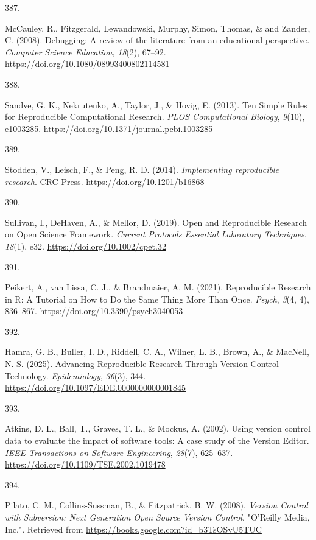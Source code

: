 \documentclass[
  11pt,
  letterpaper,
]{scrreprt}
\newlength{\cslhangindent}
\newlength{\csllabelwidth}
\newenvironment{CSLReferences}[2] %
 {\begin{list}{}{%
  \setlength{\itemindent}{0pt}
  \setlength{\leftmargin}{0pt}
  \setlength{\parsep}{0pt}
  \ifodd #1
   \setlength{\leftmargin}{\cslhangindent}
   \setlength{\itemindent}{-1\cslhangindent}
  \fi
  \setlength{\itemsep}{#2\baselineskip}}}
 {\end{list}}
\newcommand{\CSLLeftMargin}[1]{\parbox[t]{\csllabelwidth}{\strut#1\strut}}
\newcommand{\CSLRightInline}[1]{\parbox[t]{\linewidth - \csllabelwidth}{\strut#1\strut}}
\begin{document}
\begin{CSLReferences}{0}{0}
\CSLLeftMargin{387. }%
\CSLRightInline{McCauley, R., Fitzgerald, Lewandowski, Murphy, Simon,
Thomas, \& and Zander, C. (2008). Debugging: A review of the literature
from an educational perspective. \emph{Computer Science Education},
\emph{18}(2), 67--92. \url{https://doi.org/10.1080/08993400802114581}}

\CSLLeftMargin{388. }%
\CSLRightInline{Sandve, G. K., Nekrutenko, A., Taylor, J., \& Hovig, E.
(2013). Ten {Simple Rules} for {Reproducible Computational Research}.
\emph{PLOS Computational Biology}, \emph{9}(10), e1003285.
\url{https://doi.org/10.1371/journal.pcbi.1003285}}

\CSLLeftMargin{389. }%
\CSLRightInline{Stodden, V., Leisch, F., \& Peng, R. D. (2014).
\emph{Implementing reproducible research}. CRC Press.
\url{https://doi.org/10.1201/b16868}}

\CSLLeftMargin{390. }%
\CSLRightInline{Sullivan, I., DeHaven, A., \& Mellor, D. (2019). Open
and {Reproducible Research} on {Open Science Framework}. \emph{Current
Protocols Essential Laboratory Techniques}, \emph{18}(1), e32.
\url{https://doi.org/10.1002/cpet.32}}

\CSLLeftMargin{391. }%
\CSLRightInline{Peikert, A., van Lissa, C. J., \& Brandmaier, A. M.
(2021). Reproducible {Research} in {R}: {A Tutorial} on {How} to {Do}
the {Same Thing More Than Once}. \emph{Psych}, \emph{3}(4, 4), 836--867.
\url{https://doi.org/10.3390/psych3040053}}

\CSLLeftMargin{392. }%
\CSLRightInline{Hamra, G. B., Buller, I. D., Riddell, C. A., Wilner, L.
B., Brown, A., \& MacNell, N. S. (2025). Advancing {Reproducible
Research Through Version Control Technology}. \emph{Epidemiology},
\emph{36}(3), 344. \url{https://doi.org/10.1097/EDE.0000000000001845}}

\CSLLeftMargin{393. }%
\CSLRightInline{Atkins, D. L., Ball, T., Graves, T. L., \& Mockus, A.
(2002). Using version control data to evaluate the impact of software
tools: A case study of the {Version Editor}. \emph{IEEE Transactions on
Software Engineering}, \emph{28}(7), 625--637.
\url{https://doi.org/10.1109/TSE.2002.1019478}}

\CSLLeftMargin{394. }%
\CSLRightInline{Pilato, C. M., Collins-Sussman, B., \& Fitzpatrick, B.
W. (2008). \emph{Version {Control} with {Subversion}: {Next Generation
Open Source Version Control}}. "O'Reilly Media, Inc.". Retrieved from
\url{https://books.google.com?id=b3TsOSvU5TUC}}


\end{CSLReferences}
\end{document}
